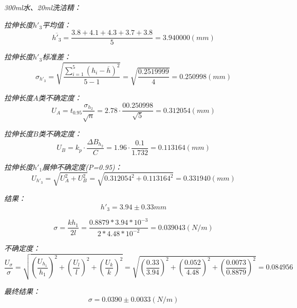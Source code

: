 \documentclass[UTF8]{ctexart}
\begin{document}
    \begin{center}
        \emph{300ml水、20ml洗洁精：}
    \end{center}
    \emph{拉伸长度$h'_3$平均值：}
    \begin{equation*}
        \overline{h'_3}=\frac{3.8	+4.1+	4.3	+3.7	+3.8}{5} =3.940000(mm)
    \end{equation*}

    \emph{拉伸长度$h'_3$标准差：}
    \begin{equation*}
        \sigma _{h'_3}=\sqrt{\frac{\sum_{i=1}^5 (h_i-\overline{h})^2}{5-1}} = \sqrt{\frac{0.2519999}{4}}=0.250998(mm)
    \end{equation*}

    \emph{拉伸长度$A$类不确定度：}
    \begin{equation*}
        U_A=t_{0.95}\frac{\sigma_{h_2}}{\sqrt{n}}=2.78·\frac{00.250998}{\sqrt{5}}=0.312054(mm)
    \end{equation*}

    \emph{拉伸长度$B$类不确定度：}
    \begin{equation*}
        U_B=k_p·\frac{\varDelta B_{h_2}}{C}=1.96·\frac{0.1}{1.732}=0.113164(mm)
    \end{equation*}

    \emph{拉伸长度$h'_1$展伸不确定度(P=0.95)：}
    \begin{equation*}
       U_{h'_3}=\sqrt{U_A^2+U_B^2}=\sqrt{0.312054^2+0.113164^2}=0.331940(mm)
    \end{equation*}

    \emph{结果：}
    \begin{equation*}
        h'_3=3.94±0.33mm 
    \end{equation*}

    \begin{equation*}
        \sigma = \frac{kh_1}{2l} = \frac{0.8879*3.94*10^{-3}}{2*4.48*10^{-2}} = 0.039043(N/m)
    \end{equation*}
    
    \emph{不确定度：}
    \begin{equation*}
        \frac{U_{\sigma}}{\sigma}=\sqrt{(\frac{U_{h_1}}{h_1})^2+(\frac{U_l}{l})^2+(\frac{U_k}{k})^2}=
        \sqrt{(\frac{0.33}{3.94})^2+(\frac{0.052}{4.48})^2+(\frac{0.0073}{0.8879})^2}= 0.084956
    \end{equation*}

    \emph{最终结果：}
    \begin{equation}
        \sigma=0.0390±0.0033(N/m)
    \end{equation}
\end{document}
